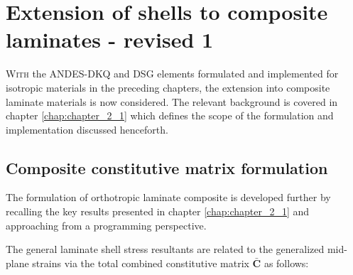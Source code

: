 



\chapter{Extension of shells to composite laminates - revised 1}
\label{chap:chapter_composite_formulation_implementation}

\renewcommand{\Thema}{Extension of shells to composite laminates}

\lettrine[lines=2]{W}{ith} the ANDES-DKQ and DSG elements formulated and implemented for isotropic materials in the preceding chapters, the extension into composite laminate materials is now considered. The relevant background is covered in chapter \ref{chap:chapter_2_1} which defines the scope of the formulation and implementation discussed henceforth.

\section{Composite constitutive matrix formulation}
The formulation of orthotropic laminate composite is developed further by recalling the key results presented in chapter \ref{chap:chapter_2_1} and approaching from a programming perspective.

The general laminate shell stress resultants are related to the generalized mid-plane strains via the total combined constitutive matrix $\bar{\mathbf{C}}$ as follows:

